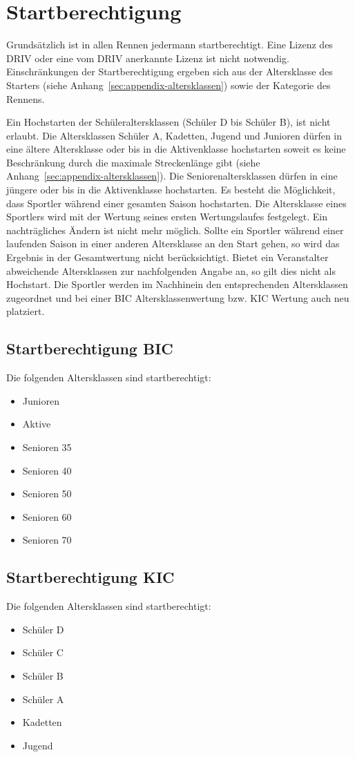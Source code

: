 \section{Startberechtigung}
Grundsätzlich ist in allen Rennen jedermann startberechtigt. Eine Lizenz des DRIV oder eine vom DRIV anerkannte Lizenz ist nicht notwendig. Einschränkungen der Startberechtigung ergeben sich aus der Altersklasse des Starters (siehe Anhang~\ref{sec:appendix-altersklassen}) sowie der Kategorie des Rennens.

Ein Hochstarten der Schüleraltersklassen (Schüler D bis Schüler B), ist nicht erlaubt. Die Altersklassen Schüler A, Kadetten, Jugend und Junioren dürfen in eine ältere Altersklasse oder bis in die Aktivenklasse hochstarten soweit es keine Beschränkung durch die maximale Streckenlänge gibt (siehe Anhang~\ref{sec:appendix-altersklassen}). Die Seniorenaltersklassen dürfen in eine jüngere oder bis in die Aktivenklasse hochstarten.
Es besteht die Möglichkeit, dass Sportler während einer gesamten Saison hochstarten. Die Altersklasse eines Sportlers wird mit der Wertung seines ersten Wertungslaufes festgelegt. Ein nachträgliches Ändern ist nicht mehr möglich. Sollte ein Sportler während einer laufenden Saison in einer anderen Altersklasse an den Start gehen, so wird das Ergebnis in der Gesamtwertung nicht berücksichtigt. Bietet ein Veranstalter abweichende Altersklassen zur nachfolgenden Angabe an, so gilt dies nicht als Hochstart. Die Sportler werden im Nachhinein den entsprechenden Altersklassen zugeordnet und bei einer BIC Altersklassenwertung bzw. KIC Wertung auch neu platziert.

\subsection{Startberechtigung BIC}
Die folgenden Altersklassen sind startberechtigt:
\begin{itemize}
	\item Junioren
	\item Aktive
	\item Senioren 35
	\item Senioren 40
	\item Senioren 50
	\item Senioren 60
	\item Senioren 70
\end{itemize}

\subsection{Startberechtigung KIC}
Die folgenden Altersklassen sind startberechtigt:
\begin{itemize}
	\item Schüler D
	\item Schüler C
	\item Schüler B
	\item Schüler A
	\item Kadetten
	\item Jugend
\end{itemize}

